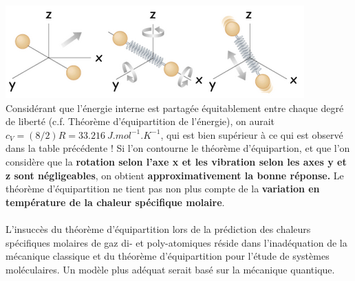 \documentclass{article}
\begin{document}
        \includegraphics{gaz_diatomique.png}\\
        Considérant que l'énergie interne est partagée équitablement entre chaque degré de liberté (c.f. Théorème d'équipartition de l'énergie), on aurait $c_V = (8/2)R = 33.216 \: J.mol^{-1}.K^{-1}$, qui est bien supérieur à ce qui est observé dans la table précédente !
        Si l'on contourne le théorème d'équipartion, et que l'on considère que la \textbf{rotation selon l'axe x et les vibration selon les axes y et z sont négligeables}, on obtient \textbf{approximativement la bonne réponse.}
        Le théorème d'équipartition ne tient pas non plus compte de la \textbf{variation en température de la chaleur spécifique molaire}. \\\\
        L’insuccès du théorème d’équipartition lors de la prédiction des chaleurs spécifiques molaires de gaz di- et poly-atomiques réside dans l’inadéquation de la mécanique classique et du théorème d'équipartition pour l’étude de systèmes moléculaires. 
        Un modèle plus adéquat serait basé sur la mécanique quantique.
    
\end{document}
